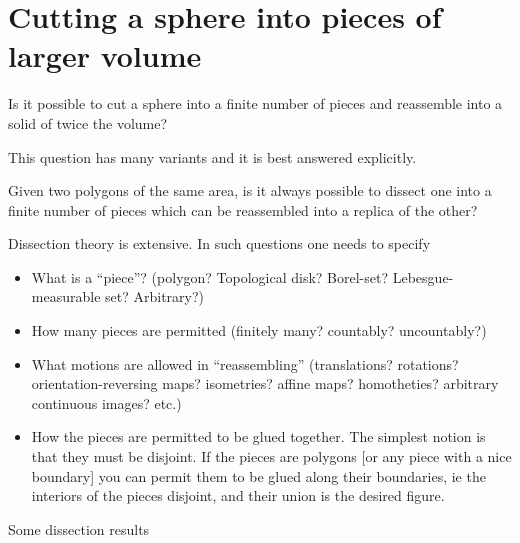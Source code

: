 \section{Cutting a sphere into pieces of larger volume}


Is it possible
    to cut a sphere into a finite number of pieces and reassemble
    into a solid of twice the volume?

  This question has many variants and it is best answered explicitly.

    Given two polygons of the same area, is it always possible to
    dissect one into a finite number of pieces which can be reassembled
    into a replica of the other?

    Dissection theory is extensive.  In such questions one needs to
    specify

\begin{itemize}
\item What is a ``piece''?  (polygon?  Topological disk?  Borel-set?
         Lebesgue-measurable set?  Arbitrary?)

    \item How many pieces are permitted (finitely many? countably? uncountably?)

    \item What motions are allowed in ``reassembling'' (translations?
         rotations?  orientation-reversing maps?  isometries?
         affine maps?  homotheties?  arbitrary continuous images?  etc.)

     \item How the pieces are permitted to be glued together.  The
         simplest notion is that they must be disjoint.  If the pieces
         are polygons [or any piece with a nice boundary] you can permit
         them to be glued along their boundaries, ie the interiors of the
         pieces disjoint, and their union is the desired figure.
\end{itemize}

    Some dissection results

